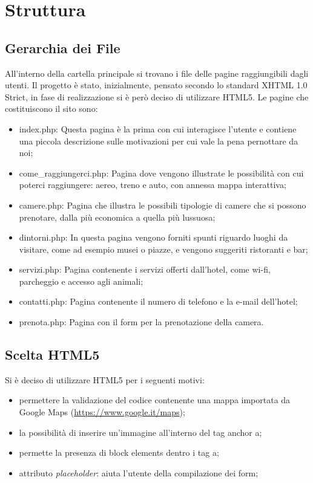 \section{Struttura}
\subsection{Gerarchia dei File}
All'interno della cartella principale si trovano i file delle pagine raggiungibili dagli utenti. Il progetto è stato, inizialmente, pensato secondo lo standard XHTML 1.0 Strict, in fase di realizzazione si è però deciso di utilizzare HTML5. 
Le pagine che costituiscono il sito sono:
\begin{itemize} 
\item index.php: Questa pagina è la prima con cui interagisce l'utente e contiene una piccola descrizione sulle motivazioni per cui vale la pena pernottare da noi;
\item come\_raggiungerci.php: Pagina dove vengono illustrate le possibilità con cui poterci raggiungere: aereo, treno e auto, con annessa mappa interattiva;
\item camere.php: Pagina che illustra le possibili tipologie di camere che si possono prenotare, dalla più economica a quella più lussuosa;
\item dintorni.php: In questa pagina vengono forniti spunti riguardo luoghi da visitare, come ad esempio musei o piazze, e vengono suggeriti ristoranti e bar;
\item servizi.php: Pagina contenente i servizi offerti dall'hotel, come wi-fi, parcheggio e accesso agli animali;
\item contatti.php: Pagina contenente il numero di telefono e la e-mail dell'hotel;
\item prenota.php: Pagina con il form per la prenotazione della camera.
\end{itemize}
\subsection{Scelta HTML5}
Si è deciso di utilizzare HTML5 per i seguenti motivi:
\begin{itemize}
\item permettere la validazione del codice contenente una mappa importata da Google Maps (\underline{\color{Blue}https://www.google.it/maps});
\item la possibilità di inserire un'immagine all'interno del tag anchor a;
\item permette la presenza di block elements dentro i tag a;
\item attributo \textit{placeholder}: aiuta l'utente della compilazione dei form;
\end{itemize} 
